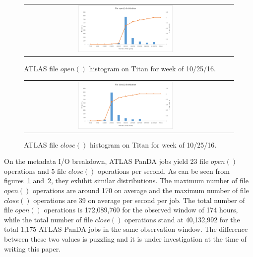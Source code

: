 \begin{figure}[!htb]
    \centering
    \begin{tabular}{cc}
        {\includegraphics[width=0.48\textwidth]{figures/panda_file_open_hist.pdf}}\\
    \end{tabular}
    \caption{ATLAS file $open()$ histogram on Titan for week of 10/25/16.}
\label{fig:atlas-titan-file-open}
\end{figure}


\begin{figure}[!htb]
    \centering
    \begin{tabular}{cc}
        {\includegraphics[width=0.48\textwidth]{figures/panda_file_close_hist.pdf}}\\
    \end{tabular}
    \caption{ATLAS file $close()$ histogram on Titan for week of 10/25/16.}
\label{fig:atlas-titan-file-close}
\end{figure}

On the metadata I/O breakdown, ATLAS PanDA jobs yield 23 file $open()$
operations and 5 file $close()$ operations per second. As can be seen from
figures~\ref{fig:atlas-titan-file-open} and~\ref{fig:atlas-titan-file-close},
they exhibit similar distributions. The maximum number of file $open()$
operations are around 170 on average and the maximum number of file $close()$
operations are 39 on average per second per job. The total number of file
$open()$ operations is 172,089,760 for the observed window of 174 hours, while
the total number of file $close()$ operations stand at 40,132,992 for the total
1,175 ATLAS PanDA jobs in the same observation window. The difference between
these two values is puzzling and it is under investigation at the time of
writing this paper. {}


